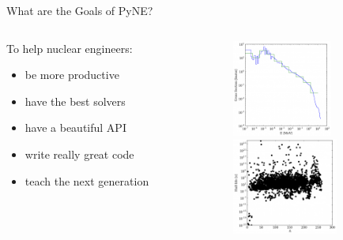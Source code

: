 \documentclass[xcolor=x11names,compress]{beamer}
\renewcommand{\(}{\begin{columns}}
\renewcommand{\)}{\end{columns}}
\newcommand{\<}[1]{\begin{column}{#1}}
\renewcommand{\>}{\end{column}}
\begin{document}
\begin{frame}{What are the Goals of PyNE?}

    \begin{columns}
    \begin{column}{0.4\textwidth}
        To help nuclear engineers:
        \begin{itemize}
        \item be more productive
        \item have the best solvers
        \item have a beautiful API
        \item write really great code
        \item teach the next generation
        \end{itemize}
  	\end{column}
 	\begin{column}{0.5\textwidth}
 	   \begin{center}
 	   \begin{figure}
 	   \includegraphics[height=1.25in,clip]{data_sources_thumb}  \\
       \includegraphics[height=1.25in,clip]{half_life_thumb}
	   \end{figure}
 	   \end{center}
  	\end{column}
	\end{columns}


\end{frame}
\end{document}
